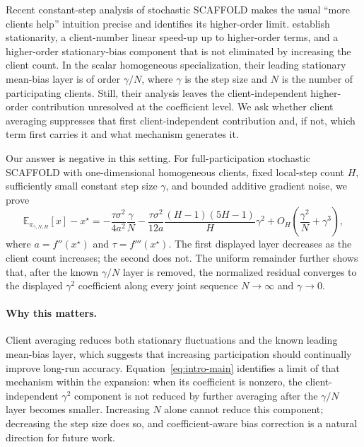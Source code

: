 \documentclass[11pt]{article}
\theoremstyle{definition}
\newcommand{\E}{\mathbb{E}}
\newcommand{\Scaf}{\textnormal{\textsc{SCAFFOLD}}}
\begin{document}
Recent constant-step analysis of stochastic \Scaf{} makes the usual ``more clients help'' intuition precise and identifies its higher-order limit. \citet{mangold2025scaffold} establish stationarity, a client-number linear speed-up up to higher-order terms, and a higher-order stationary-bias component that is not eliminated by increasing the client count. In the scalar homogeneous specialization, their leading stationary mean-bias layer is of order $\gamma/N$, where $\gamma$ is the step size and $N$ is the number of participating clients. Still, their analysis leaves the client-independent higher-order contribution unresolved at the coefficient level. We ask whether client averaging suppresses that first client-independent contribution and, if not, which term first carries it and what mechanism generates it.

Our answer is negative in this setting. For full-participation stochastic \Scaf{} with one-dimensional homogeneous clients, fixed local-step count $H$, sufficiently small constant step size $\gamma$, and bounded additive gradient noise, we prove
\begin{equation}
\label{eq:intro-main}
\E_{\pi_{\gamma,N,H}}[x]-x^\star
= -\frac{\tau\sigma^2}{4a^2}\frac{\gamma}{N}
-\frac{\tau\sigma^2}{12a}\frac{(H-1)(5H-1)}{H}\gamma^2
+O_H\!\left(\frac{\gamma^2}{N}+\gamma^3\right),
\end{equation}
where $a=f''(x^\star)$ and $\tau=f'''(x^\star)$. The first displayed layer decreases as the client count increases; the second does not. The uniform remainder further shows that, after the known $\gamma/N$ layer is removed, the normalized residual converges to the displayed $\gamma^2$ coefficient along every joint sequence $N\to\infty$ and $\gamma\to0$.

\paragraph{Why this matters.}
Client averaging reduces both stationary fluctuations and the known leading mean-bias layer, which suggests that increasing participation should continually improve long-run accuracy. Equation~\eqref{eq:intro-main} identifies a limit of that mechanism within the expansion: when its coefficient is nonzero, the client-independent $\gamma^2$ component is not reduced by further averaging after the $\gamma/N$ layer becomes smaller. Increasing $N$ alone cannot reduce this component; decreasing the step size does so, and coefficient-aware bias correction is a natural direction for future work.
\end{document}
